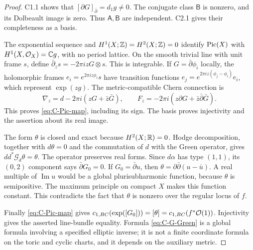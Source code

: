 \begin{proof}
C1.1 shows that $[\partial G]_{\bar\partial}=d_1g\ne0$.
The conjugate class $\mathsf B$ is nonzero, and its Dolbeault image
is zero.  Thus $\mathsf A,\mathsf B$ are independent.  C2.1 gives
their completeness as a basis.

The exponential sequence and $H^1(X;\mathbb Z)=H^2(X;\mathbb Z)=0$ identify
$\operatorname{Pic}(X)$ with $H^1(X,\mathcal O_X)=\mathbb C g$, with no period lattice.
On the smooth trivial line with unit frame $s$, define
$\bar\partial_zs=-2\pi izG\otimes s$.  This is integrable.
If $G=\bar\partial\phi_i$ locally, the holomorphic frames
$e_i=e^{2\pi iz\phi_i}s$ have transition functions
$e_j=e^{2\pi iz(\phi_j-\phi_i)}e_i$, which represent
$\exp(zg)$.  The metric-compatible Chern connection is
\[
\nabla_z=d-2\pi i(zG+\bar z\bar G),\qquad
F_z=-2\pi i(z\partial G+\bar z\bar\partial\bar G).
\]
This proves \eqref{eq:C-Pic-map}, including its sign.  The basis
proves injectivity and the assertion about its real image.

The form $\theta$ is closed and exact because $H^2(X;\mathbb R)=0$.
Hodge decomposition, together with $d\theta=0$ and the commutation
of $d$ with the Green operator, gives $dd^*\mathcal G_d\theta=
\theta$.  The operator preserves real forms.  Since $d\alpha$ has
type $(1,1)$, its $(0,2)$ component says
$\bar\partial G_0=0$.  If $G_0=\bar\partial u$, then
$\theta=\partial\bar\partial(u-\bar u)$.  A real multiple of
$\operatorname{Im}u$ would be a global plurisubharmonic function,
because $\theta$ is semipositive.  The maximum principle on compact
$X$ makes this function constant.  This contradicts the fact that
$\theta$ is nonzero over the regular locus of $f$.

Finally \eqref{eq:C-Pic-map} gives
$c_{1,BC}(\exp([G_0]))=[\theta]=c_{1,BC}(f^*\mathcal O(1))$.
Injectivity gives the asserted line-bundle equality.  Formula
\eqref{eq:C-G-Green} is a global formula involving a specified
elliptic inverse; it is not a finite coordinate formula on the toric
and cyclic charts, and it depends on the auxiliary metric.
\end{proof}

